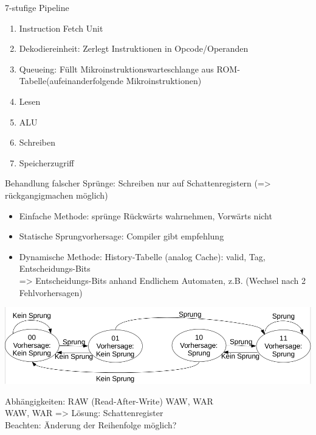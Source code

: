 
7-stufige Pipeline
\begin{enumerate}
\item Instruction Fetch Unit
\item Dekodiereinheit: Zerlegt Instruktionen in Opcode/Operanden
\item Queueing: Füllt Mikroinstruktionswarteschlange aus ROM-Tabelle(aufeinanderfolgende Mikroinstruktionen)
\item Lesen
\item ALU
\item Schreiben
\item Speicherzugriff
\end{enumerate}

Behandlung falscher Sprünge: Schreiben nur auf Schattenregistern (=> rückgangigmachen möglich)
\begin{itemize}
\item Einfache Methode: sprünge Rückwärts wahrnehmen, Vorwärts nicht
\item Statische Sprungvorhersage: Compiler gibt empfehlung
\item Dynamische Methode: History-Tabelle (analog Cache): valid, Tag, Entscheidungs-Bits\\
=> Entscheidungs-Bits anhand Endlichem Automaten, z.B. (Wechsel nach 2 Fehlvorhersagen)
\end{itemize}
\includegraphics[width=\textwidth]{Sprung}

Abhängigkeiten: RAW (Read-After-Write) WAW, WAR\\
WAW, WAR => Lösung: Schattenregister\\
Beachten: Änderung der Reihenfolge möglich?

